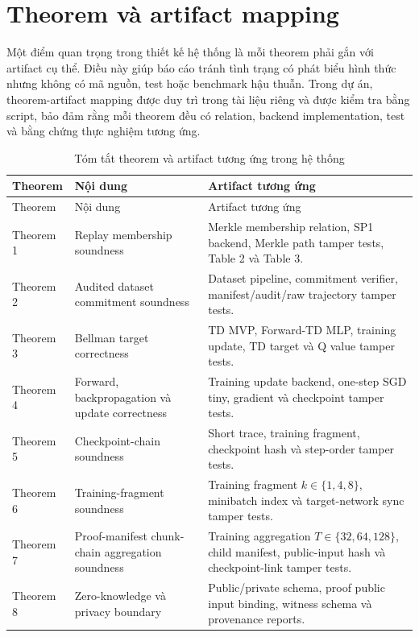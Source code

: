 \documentclass[12pt,a4paper,oneside]{report}
\begin{document}
\section{Theorem và artifact mapping}

Một điểm quan trọng trong thiết kế hệ thống là mỗi theorem phải gắn với artifact cụ thể. Điều này giúp báo cáo tránh tình trạng có phát biểu hình thức nhưng không có mã nguồn, test hoặc benchmark hậu thuẫn. Trong dự án, theorem-artifact mapping được duy trì trong tài liệu riêng và được kiểm tra bằng script, bảo đảm rằng mỗi theorem đều có relation, backend implementation, test và bằng chứng thực nghiệm tương ứng.

\begin{longtable}{p{} p{} p{}}
\caption{Tóm tắt theorem và artifact tương ứng trong hệ thống} \\
\toprule
Theorem & Nội dung & Artifact tương ứng \\
\midrule
\endfirsthead

\toprule
Theorem & Nội dung & Artifact tương ứng \\
\midrule
\endhead

Theorem 1 & Replay membership soundness & Merkle membership relation, SP1 backend, Merkle path tamper tests, Table 2 và Table 3. \\

Theorem 2 & Audited dataset commitment soundness & Dataset pipeline, commitment verifier, manifest/audit/raw trajectory tamper tests. \\

Theorem 3 & Bellman target correctness & TD MVP, Forward-TD MLP, training update, TD target và Q value tamper tests. \\

Theorem 4 & Forward, backpropagation và update correctness & Training update backend, one-step SGD tiny, gradient và checkpoint tamper tests. \\

Theorem 5 & Checkpoint-chain soundness & Short trace, training fragment, checkpoint hash và step-order tamper tests. \\

Theorem 6 & Training-fragment soundness & Training fragment \(k \in \{1,4,8\}\), minibatch index và target-network sync tamper tests. \\

Theorem 7 & Proof-manifest chunk-chain aggregation soundness & Training aggregation \(T \in \{32,64,128\}\), child manifest, public-input hash và checkpoint-link tamper tests. \\

Theorem 8 & Zero-knowledge và privacy boundary & Public/private schema, proof public input binding, witness schema và provenance reports. \\
\bottomrule
\end{longtable}
\end{document}
